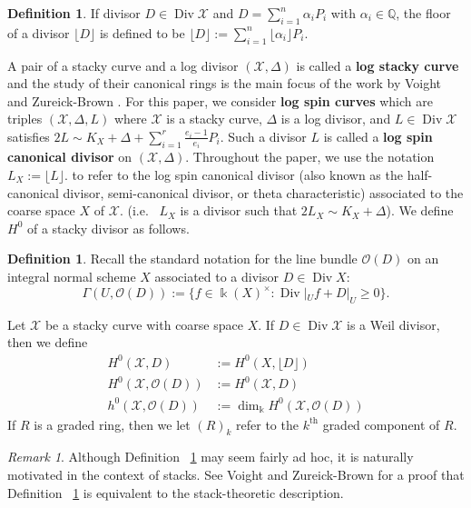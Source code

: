 \documentclass{amsart}
\theoremstyle{plain}
\theoremstyle{definition}
\newtheorem{defn}[thm]{Definition}
\theoremstyle{remark}
\newtheorem{rem}[thm]{Remark}
\numberwithin{equation}{section}
\newcommand\BQ{{\mathbb Q}}
\newcommand\Bk{{\Bbbk}}
\newcommand\sco{{\mathscr O}}
\DeclareMathOperator\di{Div}
\newcommand\sx{\mathscr X}
\newcommand{\halfcan}{L}
\begin{document}
\begin{defn}
\label{defn:divisor-floor}
If divisor $D \in \di \sx$ and $D = \sum_{i = 1}^{n} \alpha_i P_i$
with $\alpha_i \in \BQ$, the floor of a divisor $\lfloor D
\rfloor$ is defined to be $\lfloor D \rfloor := \sum_{i = 1}^{n}
\lfloor \alpha_i \rfloor P_i$.
\end{defn}

A pair of a stacky curve and a log divisor $(\sx, \Delta)$ is
called a \textbf{log stacky curve} and the study of their
canonical rings is the main focus of the work by Voight and 
Zureick-Brown \cite{vzb:stacky}. For this paper, we consider \textbf{log
spin curves} which are triples $(\sx, \Delta, \halfcan)$ where $\sx$
is a stacky curve, $\Delta$ is a log divisor, and $\halfcan \in \di
\sx$ satisfies $2 \halfcan \sim K_X + \Delta + \sum_{i = 1}^{r}
\frac{e_i - 1}{e_i} P_i$. Such a divisor $\halfcan$ is called a
\textbf{log spin canonical divisor} on $(\sx, \Delta)$. Throughout the paper, we use
the notation $\halfcan_X := \lfloor L \rfloor.$ to refer to the log spin
canonical divisor (also known as the half-canonical divisor, 
semi-canonical divisor, or theta characteristic) associated to the
coarse space $X$ of $\sx.$  (i.e.~ $\halfcan_X$ is a divisor such
that $2\halfcan_X \sim K_X + \Delta$). 
We define $H^0$ of a stacky divisor as follows.

\begin{defn}
\label{defn:h0-stacky}
Recall the standard notation for the line bundle $\sco(D)$ on an integral normal scheme $X$ associated to a divisor $D \in \di X$:
\[
	\Gamma(U, \sco(D)) := \{f \in \Bk(X)^\times : \di|_U f + D|_U \geq 0 \}.
\]

\noindent
Let $\sx$ be a stacky curve with coarse space $X$.
If $D \in \di \sx$ is a Weil divisor, then we define
\begin{align*}
	H^0(\sx, D) &:= H^0(X, \lfloor D \rfloor)\\
	H^0(\sx, \sco(D)) &:= H^0(\sx, D)\\
	h^0(\sx, \sco(D)) &:= \dim_\Bk H^0(\sx, \sco(D))
\end{align*}
If $R$ is a graded ring, then we let $(R)_k$ refer to the $k^\text{th}$
graded component of $R$.

\end{defn}

\begin{rem}
Although Definition ~\ref{defn:h0-stacky} may seem fairly ad hoc, it is naturally motivated in the context of stacks. See Voight and Zureick-Brown \cite[Lemma 5.4.7]{vzb:stacky} for a proof that Definition ~\ref{defn:h0-stacky} is equivalent to the stack-theoretic description.
\end{rem}
\end{document}
